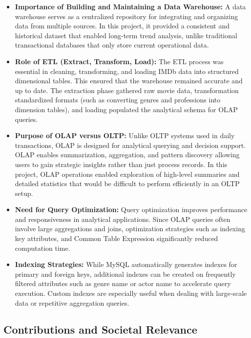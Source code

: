 \begin{itemize}
	\item \textbf{Importance of Building and Maintaining a Data Warehouse:}  
	A data warehouse serves as a centralized repository for integrating and organizing data from multiple sources. In this project, it provided a consistent and historical dataset that enabled long-term trend analysis, unlike traditional transactional databases that only store current operational data.
	
	\item \textbf{Role of ETL (Extract, Transform, Load):}  
	The ETL process was essential in cleaning, transforming, and loading IMDb data into structured dimensional tables. This ensured that the warehouse remained accurate and up to date. The extraction phase gathered raw movie data, transformation standardized formats (such as converting genres and professions into dimension tables), and loading populated the analytical schema for OLAP queries.
	
	\item \textbf{Purpose of OLAP versus OLTP:}  
	Unlike OLTP systems used in daily transactions, OLAP is designed for analytical querying and decision support. OLAP enables summarization, aggregation, and pattern discovery allowing users to gain strategic insights rather than just process records. In this project, OLAP operations enabled exploration of high-level summaries and detailed statistics that would be difficult to perform efficiently in an OLTP setup.
	
	\item \textbf{Need for Query Optimization:}  
	Query optimization improves performance and responsiveness in analytical applications. Since OLAP queries often involve large aggregations and joins, optimization strategies such as indexing key attributes, and Common Table Expression significantly reduced computation time. 
	
	\item \textbf{Indexing Strategies:}  
	While MySQL automatically generates indexes for primary and foreign keys, additional indexes can be created on frequently filtered attributes such as genre name or actor name to accelerate query execution. Custom indexes are especially useful when dealing with large-scale data or repetitive aggregation queries.
\end{itemize}

\subsection{Contributions and Societal Relevance}

